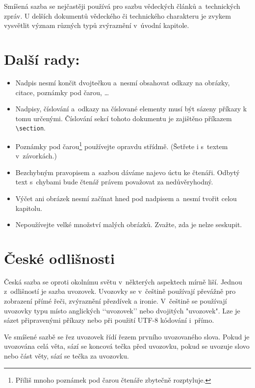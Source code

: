 \documentclass[a4paper, 10pt, twocolumn]{article}
\begin{document}
Smíšená sazba se nejčastěji používá pro sazbu vědeckých článků a~technických zpráv.
U delších dokumentů vědeckého či technického charakteru je zvykem vysvětlit význam různých typů zvýraznění v~úvodní kapitole.

\section{Další rady:}
\label{3}
\begin{itemize}
\item Nadpis nesmí končit dvojtečkou a~nesmí obsahovat odkazy na obrázky, citace, poznámky pod čarou, \dots

\item Nadpisy, číslování a~odkazy na číslované elementy musí být sázeny příkazy k tomu určenými.
Číslování sekcí tohoto dokumentu je zajištěno příkazem 	\verb|\section|.

\item Poznámky pod čarou\footnote{Příliš mnoho poznámek pod čarou čtenáře zbytečně rozptyluje.} používejte opravdu střídmě.
(Šetřete i s~textem v~závorkách.)

\item Bezchybným pravopisem a~sazbou dáváme najevo úctu ke čtenáři.
Odbytý text s~chybami bude čtenář právem považovat za nedůvěryhodný.

\item Výčet ani obrázek nesmí začínat hned pod nadpisem a~nesmí tvořit celou kapitolu.

\item Nepoužívejte velké množství malých obrázků.
Zvažte, zda je nelze seskupit.
\end{itemize}

\section{České odlišnosti}
Česká sazba se oproti okolnímu světu v~některých aspektech mírně liší.
Jednou z~odlišností je sazba uvozovek.
Uvozovky se v~češtině používají převážně pro zobrazení přímé řeči, zvýraznění přezdívek a ironie.
V~češtině se používají uvozovky typu  místo anglických ‘‘uvozovek’’ nebo dvojitých "uvozovek".
Lze je sázet připravenými příkazy nebo při použití UTF-8 kódování i~přímo.

Ve smíšené sazbě se řez uvozovek řídí řezem prvního uvozovaného slova.
Pokud je uvozována celá věta, sází se koncová tečka před uvozovku, pokud se uvozuje slovo nebo část věty, sází se tečka za uvozovku.
\end{document}
